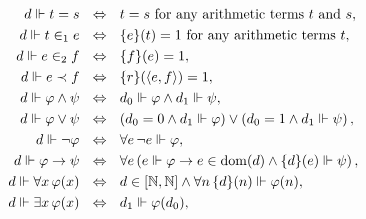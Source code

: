 \documentclass[11pt]{article}
\theoremstyle{plain}
\theoremstyle{definition}
\newcommand{\tuple}[1]{\left\langle #1 \right\rangle}
\DeclareMathOperator{\dom}{dom}
\begin{document}
\begin{align*}
    d \Vdash t = s \ \                                                   & \ratio\Leftrightarrow \ \ t = s \text{ for any arithmetic terms $t$ and $s$},                                                                                  \\
    d \Vdash t \in_1 e \ \                                               & \ratio\Leftrightarrow \ \ \mleft\{e\mright\}\mleft(t\mright) = 1 \text{ for any arithmetic terms $t$},                                                         \\
    d \Vdash e \in_2 f \ \                                               & \ratio\Leftrightarrow \ \ \mleft\{f\mright\}\mleft(e\mright) = 1,                                                                                              \\
    d \Vdash e \prec f \ \                                               & \ratio\Leftrightarrow \ \ \mleft\{r\mright\}\mleft(\tuple{e, f}\mright) = 1,                                                                                   \\
    d \Vdash \varphi \land \psi \ \                                      & \ratio\Leftrightarrow \ \ d_0 \Vdash \varphi \land d_1 \Vdash \psi,                                                                                            \\
    d \Vdash \varphi \lor \psi \ \                                       & \ratio\Leftrightarrow \ \ \left(d_0 = 0 \land d_1 \Vdash \varphi\right) \lor \left(d_0 = 1 \land d_1 \Vdash \psi\right),                                       \\
    d \Vdash \neg \varphi \ \                                            & \ratio\Leftrightarrow \ \ \forall e \, \neg e \Vdash \varphi,                                                                                                  \\
    d \Vdash \varphi \rightarrow \psi \ \                                & \ratio\Leftrightarrow \ \ \forall e \left(e \Vdash \varphi \rightarrow e \in \dom\mleft(d\mright) \land \mleft\{d\mright\}\mleft(e\mright) \Vdash \psi\right), \\
    d \Vdash \forall x \, \varphi\mleft(x\mright) \ \                    & \ratio\Leftrightarrow \ \ d \in \left[\mathbb{N}, \mathbb{N}\right] \land \forall n \, \mleft\{d\mright\}\mleft(n\mright) \Vdash \varphi\mleft(n\mright),      \\
    d \Vdash \exists x \, \varphi\mleft(x\mright) \ \                    & \ratio\Leftrightarrow \ \ d_1 \Vdash \varphi\mleft(d_0\mright),                                                                                                \\

\end{align*}
\end{document}
